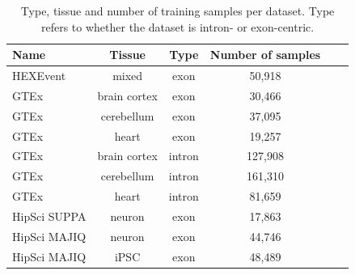 \begin{table}[h!]
	\centering
	\begin{tabular}{l | c c | c c c} 
		\toprule
		Name & Tissue & Type & Number of samples\\
		\toprule
		HEXEvent & mixed & exon & 50,918 \\
		\hline
		GTEx & brain cortex & exon & 30,466\\
		GTEx & cerebellum & exon & 37,095\\
		GTEx & heart & exon & 19,257\\
		\hline
		GTEx & brain cortex & intron & 127,908\\
		GTEx & cerebellum & intron & 161,310\\
		GTEx & heart & intron & 81,659\\
		\hline
		HipSci SUPPA & neuron & exon & 17,863 \\
		HipSci MAJIQ & neuron & exon & 44,746 \\
		HipSci MAJIQ & iPSC & exon & 48,489 \\
		\hline
		
	\end{tabular}
	\caption{Type, tissue and number of training samples per dataset. Type refers to whether the dataset is intron- or exon-centric.
	}
	\label{table:datasets}
\end{table}


